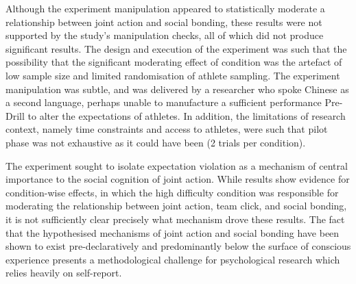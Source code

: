 Although the experiment manipulation appeared to statistically moderate a relationship between joint action and social bonding, these results were not supported by the study's manipulation checks, all of which did not produce significant results.  The design and execution of the experiment was such that the possibility that the significant moderating effect of condition was the artefact of low sample size and limited randomisation of athlete sampling. The experiment manipulation was subtle, and was delivered by a researcher who spoke Chinese as a second language, perhaps unable to manufacture a sufficient performance Pre-Drill to alter the expectations of athletes. In addition, the limitations of research context, namely time constraints and access to athletes, were such that pilot phase was not exhaustive as it could have been (2 trials per condition).

The experiment sought to isolate expectation violation as a mechanism of central importance to the social cognition of joint action.  While results show evidence for condition-wise effects, in which the high difficulty condition was responsible for moderating the relationship between joint action, team click, and social bonding, it is not sufficiently clear precisely what mechanism drove these results.
The fact that the hypothesised mechanisms of joint action and social bonding have been shown to exist pre-declaratively and predominantly below the surface of conscious experience presents a methodological challenge for psychological research which relies heavily on self-report.



